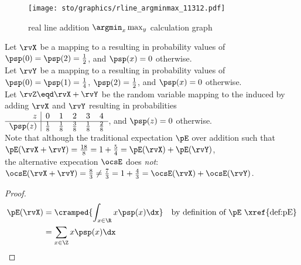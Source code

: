 \begin{tabstr}{0.75}
\begin{figure}[h]
  \gsize%
  \centering%
  {\texttt{[image: sto/graphics/rline\_argminmax\_11312.pdf]}}%
  \caption{real line addition $\argmin_x\max_y$ calculation graph \label{fig:rline_11312}}
\end{figure}
\begin{example}
\label{ex:rline_11312}
Let $\rvX$ be a   mapping to 
a    resulting in probability values of 
\\\indentx$\psp(0)=\psp(2)=\frac{1}{2}$, and $\psp(x)=0$ otherwise.\\
Let $\rvY$ be a  mapping to 
a   resulting in probability values of 
\\\indentx$\psp(0)=\psp(1)=\frac{1}{4}$, $\psp(2)=\frac{1}{2}$, and $\psp(x)=0$ otherwise.\\
Let $\rvZ\eqd\rvX+\rvY$ be the random variable mapping to the   induced by 
adding $\rvX$ and $\rvY$ resulting in probabilities 
\\\indentx$\begin{array}{r|ccccc}
  z      & 0 & 1 & 2 & 3 & 4 
  \\\hline
 \psp(z) & \frac{1}{8} & \frac{1}{8} & \frac{3}{8} & \frac{1}{8} & \frac{2}{8}  
\end{array}$, and $\psp(z)=0$ otherwise.
\\
Note that although the traditional expectation $\pE$   over addition such that
\\\indentx$\pE(\rvX+\rvY) = \frac{18}{8} = 1 + \frac{5}{4} = \pE(\rvX) + \pE(\rvY)$,\\
the alternative expecation $\ocsE$  does \emph{not}:
\\\indentx$\ocsE(\rvX+\rvY) = \frac{8}{3} \neq \frac{7}{3} =  1 + \frac{4}{3} = \ocsE(\rvX) + \ocsE(\rvY)$.
\end{example}
\begin{proof}
    \begin{align*}
      \pE(\rvX)
        &= \cramped{\int_{x\in\R} x\psp(x) \dx}
        && \text{by definition of $\pE$ \xref{def:pE}}
      \\&= \sum_{x\in\Z} x\psp(x) \dx

\end{align*}
\end{proof}
\end{tabstr}
